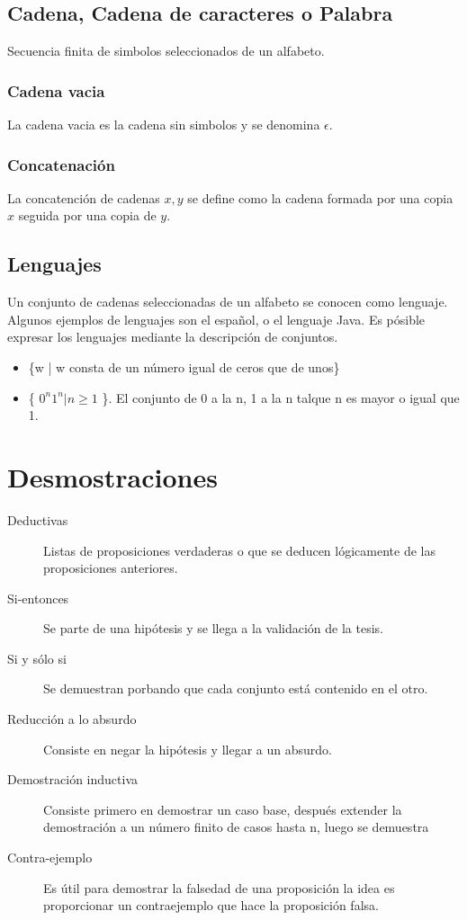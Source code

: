 \documentclass[a4paper,9pt]{extarticle}
\begin{document}
\begin{multicols*}{2}
\subsection{Cadena, Cadena de caracteres o Palabra}
Secuencia finita de simbolos seleccionados de un alfabeto.

\subsubsection{Cadena vacia}
La cadena vacia es la cadena sin simbolos y se denomina $\epsilon$.

\subsubsection{Concatenación}
La concatención de cadenas $x,y$ se define como la cadena formada por una copia $x$ seguida por una copia de $y$.

\subsection{Lenguajes}
Un conjunto de cadenas seleccionadas de un alfabeto se conocen como lenguaje. Algunos ejemplos de lenguajes son el español, o el lenguaje Java. Es pósible expresar los lenguajes mediante la descripción de conjuntos.

\begin{itemize}
\item \{w | w consta de un número igual de ceros que de unos\}
\item \{ $0^n1^n | n \geqslant 1$  \}. El conjunto de 0 a la n, 1 a la n talque n es mayor o igual que 1.
\end{itemize}


\section{Desmostraciones}
\begin{description}
\item[Deductivas] Listas de proposiciones verdaderas o que se deducen lógicamente de las proposiciones anteriores.
\item[Si-entonces] Se parte de una hipótesis y se llega a la validación de la tesis.
\item[Si y sólo si] Se demuestran porbando que cada conjunto está contenido en el otro.
\item[Reducción a lo absurdo] Consiste en negar la hipótesis y llegar a un absurdo.
\item[Demostración inductiva] Consiste primero en demostrar un caso base, después extender la demostración a un número finito de casos hasta n, luego se demuestra  
\item[Contra-ejemplo] Es útil para demostrar la falsedad de una proposición la idea es proporcionar un contraejemplo que hace la proposición falsa.
\end{description}


\end{multicols*}
\end{document}
